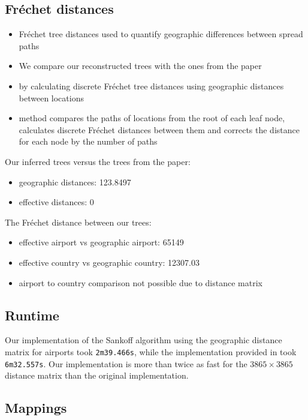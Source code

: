 \documentclass{article}
\begin{document}
\subsection{Fr\'{e}chet distances}
\begin{itemize}
    \item Fr\'{e}chet tree distances used to quantify geographic differences between spread paths
    \item We compare our reconstructed trees with the ones from the paper
    \item by calculating discrete Fr\'{e}chet tree distances using geographic distances between locations
    \item method compares the paths of locations from the root of each leaf node, calculates discrete Fr\'{e}chet distances between them and corrects the distance for each node by the number of paths
\end{itemize}

Our inferred trees versus the trees from the paper:
\begin{itemize}
    \item geographic distances: 123.8497
    \item effective distances: 0
\end{itemize}

The Fr\'{e}chet distance between our trees:
\begin{itemize}
    \item effective airport vs geographic airport: 65149
    \item effective country vs geographic country: 12307.03
    \item airport to country comparison not possible due to distance matrix
\end{itemize}

\subsection{Runtime}
Our implementation of the Sankoff algorithm using the geographic distance
matrix for airports took \texttt{2m39.466s}, while the implementation provided in
\cite{reimeringPhylogeographicReconstructionUsing2020} took \texttt{6m32.557s}.
Our implementation is more than twice as fast for the $3865 \times 3865$
distance matrix than the original implementation.

\subsection{Mappings}
\end{document}
